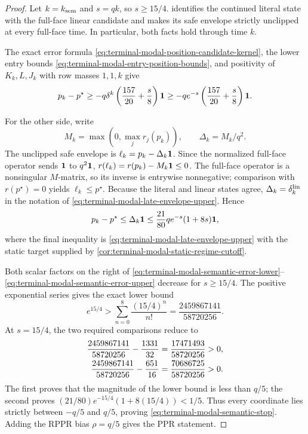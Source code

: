 \begin{proof}
Let $k=k_{\rm sem}$ and $s=qk$, so $s\ge15/4$.
 identifies the continued
literal state with the full-face linear candidate and makes its safe envelope
strictly unclipped at every full-face time.  In particular, both facts hold
through time $k$.

The exact error formula
\eqref{eq:terminal-modal-position-candidate-kernel}, the lower entry bounds
\eqref{eq:terminal-modal-entry-position-bounds}, and positivity of $K_k,L,J_k$
with row masses $1,1,k$ give
\begin{equation}
 p_k-p^\star
 \ge-q\delta^k\left(\frac{157}{20}+\frac{s}{8}\right)\mathbf{1}
 \ge-qe^{-s}\left(\frac{157}{20}+\frac{s}{8}\right)\mathbf{1}.
 \label{eq:terminal-modal-semantic-error-lower}
\end{equation}

For the other side, write
\[
 M_k=\max(0,\max_j r_j(p_k)),
 \qquad
 \Delta_k=M_k/q^2.
\]
The unclipped safe envelope is $\ell_k=p_k-\Delta_k\mathbf{1}$.  Since the
normalized full-face operator sends $\mathbf{1}$ to $q^2\mathbf{1}$,
$r(\ell_k)=r(p_k)-M_k\mathbf{1}\le0$.  The full-face operator is a nonsingular
$M$-matrix, so its inverse is entrywise nonnegative; comparison with
$r(p^\star)=0$ yields $\ell_k\le p^\star$.  Because the literal and linear
states agree, $\Delta_k=\delta_k^{\rm lin}$ in the notation of
\eqref{eq:terminal-modal-late-envelope-upper}.  Hence
\begin{equation}
 p_k-p^\star\le\Delta_k\mathbf{1}
 \le\frac{21}{80}qe^{-s}(1+8s)\mathbf{1},
 \label{eq:terminal-modal-semantic-error-upper}
\end{equation}
where the final inequality is
\eqref{eq:terminal-modal-late-envelope-upper} with the static target supplied
by \cref{cor:terminal-modal-static-regime-cutoff}.

Both scalar factors on the right of
\eqref{eq:terminal-modal-semantic-error-lower}--
\eqref{eq:terminal-modal-semantic-error-upper} decrease for $s\ge15/4$.
The positive exponential series gives the exact lower bound
\begin{equation}
 e^{15/4}>
 \sum_{n=0}^{8}\frac{(15/4)^n}{n!}
 =\frac{2459867141}{58720256}.
 \label{eq:terminal-modal-semantic-exp-fifteen-fourths}
\end{equation}
At $s=15/4$, the two required comparisons reduce to
\begin{align}
 \frac{2459867141}{58720256}-\frac{1331}{32}
 &=\frac{17471493}{58720256}>0,\notag\\
 \frac{2459867141}{58720256}-\frac{651}{16}
 &=\frac{70686725}{58720256}>0.
 \label{eq:terminal-modal-semantic-rational-slacks}
\end{align}
The first proves that the magnitude of the lower bound is less than $q/5$;
the second proves
$(21/80)e^{-15/4}(1+8(15/4))<1/5$.  Thus every coordinate lies strictly
between $-q/5$ and $q/5$, proving
\eqref{eq:terminal-modal-semantic-stop}.  Adding the RPPR bias $\rho=q/5$
gives the PPR statement.
\end{proof}

